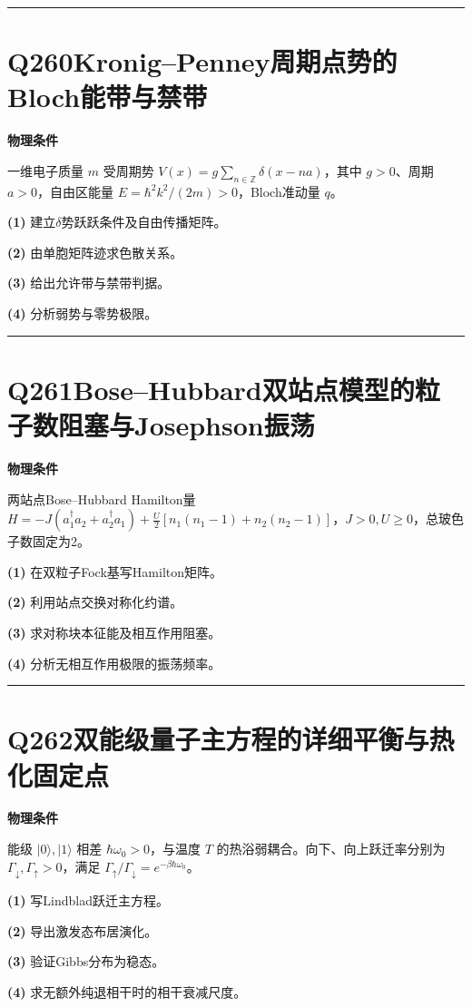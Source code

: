 \documentclass[UTF8,a4paper,11pt,oneside,openany]{ctexbook}
\begin{document}
\par\bigskip\hrule\bigskip
\section*{Q260\quad Kronig–Penney周期点势的Bloch能带与禁带}
\textbf{物理条件}\par 一维电子质量 \(m\) 受周期势 \(V(x)=g\sum_{n\in\mathbb Z}\delta(x-na)\)，其中 \(g>0\)、周期 \(a>0\)，自由区能量 \(E=\hbar^2k^2/(2m)>0\)，Bloch准动量 \(q\)。
\par\noindent\textbf{(1)} 建立\(\delta\)势跃跃条件及自由传播矩阵。
\par\noindent\textbf{(2)} 由单胞矩阵迹求色散关系。
\par\noindent\textbf{(3)} 给出允许带与禁带判据。
\par\noindent\textbf{(4)} 分析弱势与零势极限。

\par\bigskip\hrule\bigskip
\section*{Q261\quad Bose–Hubbard双站点模型的粒子数阻塞与Josephson振荡}
\textbf{物理条件}\par 两站点Bose–Hubbard Hamilton量 \(H=-J(a_1^\dagger a_2+a_2^\dagger a_1)+\frac U2[n_1(n_1-1)+n_2(n_2-1)]\)，\(J>0,U\ge0\)，总玻色子数固定为2。
\par\noindent\textbf{(1)} 在双粒子Fock基写Hamilton矩阵。
\par\noindent\textbf{(2)} 利用站点交换对称化约谱。
\par\noindent\textbf{(3)} 求对称块本征能及相互作用阻塞。
\par\noindent\textbf{(4)} 分析无相互作用极限的振荡频率。

\par\bigskip\hrule\bigskip
\section*{Q262\quad 双能级量子主方程的详细平衡与热化固定点}
\textbf{物理条件}\par 能级 \(|0\rangle,|1\rangle\) 相差 \(\hbar\omega_0>0\)，与温度 \(T\) 的热浴弱耦合。向下、向上跃迁率分别为 \(\Gamma_\downarrow,\Gamma_\uparrow>0\)，满足 \(\Gamma_\uparrow/\Gamma_\downarrow=e^{-\beta\hbar\omega_0}\)。
\par\noindent\textbf{(1)} 写Lindblad跃迁主方程。
\par\noindent\textbf{(2)} 导出激发态布居演化。
\par\noindent\textbf{(3)} 验证Gibbs分布为稳态。
\par\noindent\textbf{(4)} 求无额外纯退相干时的相干衰减尺度。
\end{document}
